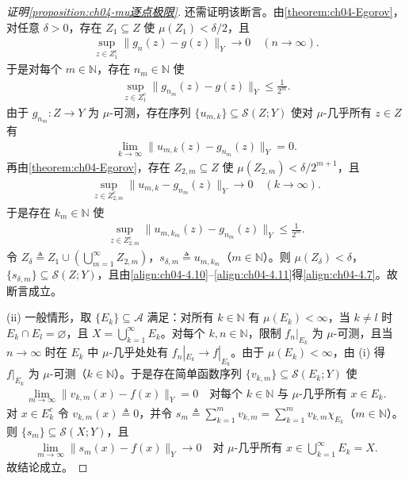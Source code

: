 \documentclass[../../main.tex]{subfiles}%
\begin{document}
\begin{proof}[证明\cref{proposition:ch04-mu逐点极限}]
还需证明该断言。由\cref{theorem:ch04-Egorov}，对任意 $\delta>0$，存在 $Z_1\subseteq Z$ 使 $\mu(Z_1)<\delta/2$，且
\begin{align*}
\sup_{z\in Z_1^c}\|g_n(z)-g(z)\|_Y\to0\quad(n\to\infty).
\end{align*}
于是对每个 $m\in\mathbb{N}$，存在 $n_m\in\mathbb{N}$ 使
\begin{align}
\sup_{z\in Z_1^c}\|g_{n_m}(z)-g(z)\|_Y\leqslant\frac1{2^m}. \label{align:ch04-4.10}
\end{align}
由于 $g_{n_m}:Z\to Y$ 为 $\mu$-可测，存在序列 $\{u_{m,k}\}\subseteq\mathcal{S}(Z;Y)$ 使对 $\mu$-几乎所有 $z\in Z$ 有
\begin{align*}
\lim_{k\to\infty}\|u_{m,k}(z)-g_{n_m}(z)\|_Y=0.
\end{align*}
再由\cref{theorem:ch04-Egorov}，存在 $Z_{2,m}\subseteq Z$ 使 $\mu(Z_{2,m})<\delta/2^{m+1}$，且
\begin{align*}
\sup_{z\in Z_{2,m}^c}\|u_{m,k}-g_{n_m}(z)\|_Y\to0\quad(k\to\infty).
\end{align*}
于是存在 $k_m\in\mathbb{N}$ 使
\begin{align}
\sup_{z\in Z_{2,m}^c}\|u_{m,k_m}(z)-g_{n_m}(z)\|_Y\leqslant\frac1{2^m}. \label{align:ch04-4.11}
\end{align}
令 $Z_\delta\triangleq Z_1\cup(\bigcup_{m=1}^\infty Z_{2,m})$，$s_{\delta,m}\triangleq u_{m,k_m}$（$m\in\mathbb{N}$）。则 $\mu(Z_\delta)<\delta$，$\{s_{\delta,m}\}\subseteq\mathcal{S}(Z;Y)$，且由\eqref{align:ch04-4.10}--\eqref{align:ch04-4.11}得\eqref{align:ch04-4.7}。故断言成立。

(ii) 一般情形，取 $\{E_k\}\subseteq\mathcal{A}$ 满足：对所有 $k\in\mathbb{N}$ 有 $\mu(E_k)<\infty$，当 $k\neq l$ 时 $E_k\cap E_l=\varnothing $，且 $X=\bigcup_{k=1}^\infty E_k$。对每个 $k,n\in\mathbb{N}$，限制 $f_n|_{E_k}$ 为 $\mu$-可测，且当 $n\to\infty$ 时在 $E_k$ 中 $\mu$-几乎处处有 $f_n|_{E_k}\to f|_{E_k}$。由于 $\mu(E_k)<\infty$，由 (i) 得 $f|_{E_k}$ 为 $\mu$-可测（$k\in\mathbb{N}$）。于是存在简单函数序列 $\{v_{k,m}\}\subseteq\mathcal{S}(E_k;Y)$ 使
\begin{align*}
\lim_{m\to\infty}\|v_{k,m}(x)-f(x)\|_Y=0\quad\text{对每个 }k\in\mathbb{N}\text{ 与 }\mu\text{-几乎所有 }x\in E_k.
\end{align*}
对 $x\in E_k^c$ 令 $v_{k,m}(x)\triangleq 0$，并令 $s_m\triangleq \sum_{k=1}^m v_{k,m}=\sum_{k=1}^m v_{k,m}\chi_{E_k}$（$m\in\mathbb{N}$）。则 $\{s_m\}\subseteq\mathcal{S}(X;Y)$，且
\begin{align*}
\lim_{m\to\infty}\|s_m(x)-f(x)\|_Y\to0\quad\text{对 }\mu\text{-几乎所有 }x\in\bigcup_{k=1}^\infty E_k=X.
\end{align*}
故结论成立。
\end{proof}
\end{document}
